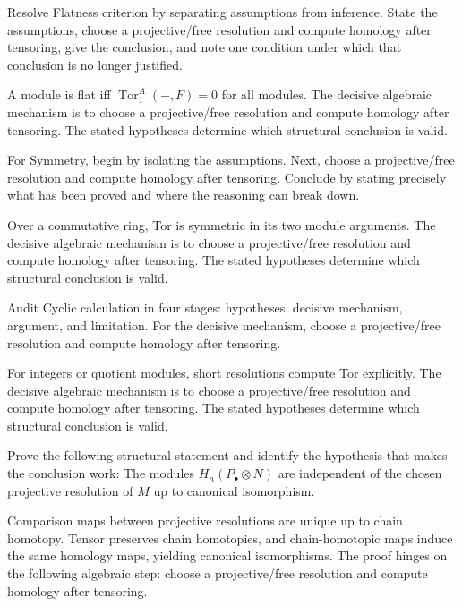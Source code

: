 \begin{problem}\label{prob:v26-problem-06}
Resolve Flatness criterion by separating assumptions from inference. State the assumptions, choose a projective/free resolution and compute homology after tensoring, give the conclusion, and note one condition under which that conclusion is no longer justified.
\end{problem}
\begin{solution}
A module is flat iff $\operatorname{Tor}_1^A(-,F)=0$ for all modules. The decisive algebraic mechanism is to choose a projective/free resolution and compute homology after tensoring. The stated hypotheses determine which structural conclusion is valid.
\end{solution}

\begin{problem}\label{prob:v26-problem-07}
For Symmetry, begin by isolating the assumptions. Next, choose a projective/free resolution and compute homology after tensoring. Conclude by stating precisely what has been proved and where the reasoning can break down.
\end{problem}
\begin{solution}
Over a commutative ring, Tor is symmetric in its two module arguments. The decisive algebraic mechanism is to choose a projective/free resolution and compute homology after tensoring. The stated hypotheses determine which structural conclusion is valid.
\end{solution}

\begin{problem}\label{prob:v26-problem-08}
Audit Cyclic calculation in four stages: hypotheses, decisive mechanism, argument, and limitation. For the decisive mechanism, choose a projective/free resolution and compute homology after tensoring.
\end{problem}
\begin{solution}
For integers or quotient modules, short resolutions compute Tor explicitly. The decisive algebraic mechanism is to choose a projective/free resolution and compute homology after tensoring. The stated hypotheses determine which structural conclusion is valid.
\end{solution}

\begin{problem}\label{prob:v26-problem-09}
Prove the following structural statement and identify the hypothesis that makes the conclusion work: The modules $H_n(P_\bullet\otimes N)$ are independent of the chosen projective resolution of $M$ up to canonical isomorphism.
\end{problem}
\begin{solution}
Comparison maps between projective resolutions are unique up to chain homotopy. Tensor preserves chain homotopies, and chain-homotopic maps induce the same homology maps, yielding canonical isomorphisms. The proof hinges on the following algebraic step: choose a projective/free resolution and compute homology after tensoring.
\end{solution}

